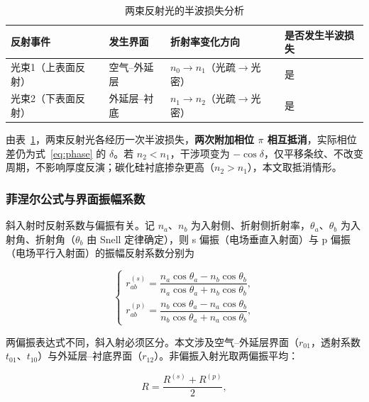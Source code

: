 \documentclass[withoutpreface,bwprint]{cumcmthesis}
\begin{document}
\begin{table}[H]
    \centering
    \caption{两束反射光的半波损失分析}
    \label{tab:halfwave}
    \small
    \begin{tabularx}{\textwidth}{>{\centering\arraybackslash}X>{\centering\arraybackslash}X>{\centering\arraybackslash}X>{\centering\arraybackslash}X}
        \toprule
        反射事件 & 发生界面 & 折射率变化方向 & 是否发生半波损失 \\
        \midrule
        光束1（上表面反射） & 空气--外延层 & $n_0 \to n_1$（光疏$\to$光密） & 是 \\
        光束2（下表面反射） & 外延层--衬底 & $n_1 \to n_2$（光疏$\to$光密） & 是 \\
        \bottomrule
    \end{tabularx}
\end{table}

由表~\ref{tab:halfwave}，两束反射光各经历一次半波损失，\textbf{两次附加相位 $\pi$ 相互抵消}，实际相位差仍为式~\eqref{eq:phase} 的 $\delta$。若 $n_2<n_1$，干涉项变为 $-\cos\delta$，仅平移条纹、不改变周期，不影响厚度反演；碳化硅衬底掺杂更高（$n_2>n_1$），本文取抵消情形。

\subsubsection{菲涅尔公式与界面振幅系数}

斜入射时反射系数与偏振有关。记 $n_a$、$n_b$ 为入射侧、折射侧折射率，$\theta_a$、$\theta_b$ 为入射角、折射角（$\theta_b$ 由 Snell 定律确定），则 s 偏振（电场垂直入射面）与 p 偏振（电场平行入射面）的振幅反射系数分别为

\begin{equation}
\begin{cases}
r_{ab}^{(s)} = \dfrac{n_a\cos\theta_a - n_b\cos\theta_b}{n_a\cos\theta_a + n_b\cos\theta_b},\\[6pt]
r_{ab}^{(p)} = \dfrac{n_b\cos\theta_a - n_a\cos\theta_b}{n_b\cos\theta_a + n_a\cos\theta_b},
\end{cases}
\label{eq:fresnel}
\end{equation}

两偏振表达式不同，斜入射必须区分。本文涉及空气--外延层界面（$r_{01}$，透射系数 $t_{01}$、$t_{10}$）与外延层--衬底界面（$r_{12}$）。非偏振入射光取两偏振平均：

\begin{equation}
R = \frac{R^{(s)} + R^{(p)}}{2},
\label{eq:polar-avg}
\end{equation}
\end{document}

